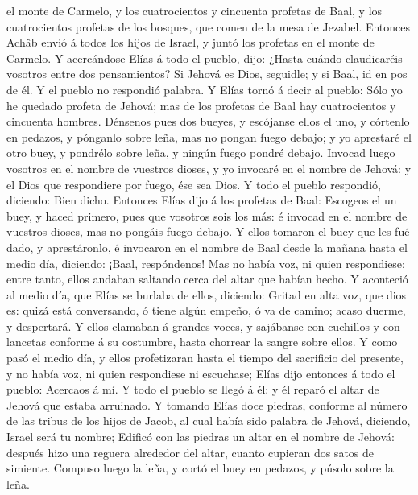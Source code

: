 el monte de Carmelo, y los cuatrocientos y cincuenta profetas de Baal, y
los cuatrocientos profetas de los bosques, que comen de la mesa de
Jezabel.  Entonces Achâb envió á todos los hijos de
Israel, y juntó los profetas en el monte de Carmelo.  Y
acercándose Elías á todo el pueblo, dijo: ¿Hasta cuándo claudicaréis
vosotros entre dos pensamientos? Si Jehová es Dios, seguidle; y si Baal,
id en pos de él. Y el pueblo no respondió palabra.  Y
Elías tornó á decir al pueblo: Sólo yo he quedado profeta de Jehová; mas
de los profetas de Baal hay cuatrocientos y cincuenta hombres.
 Dénsenos pues dos bueyes, y escójanse ellos el uno, y
córtenlo en pedazos, y pónganlo sobre leña, mas no pongan fuego debajo;
y yo aprestaré el otro buey, y pondrélo sobre leña, y ningún fuego
pondré debajo.  Invocad luego vosotros en el nombre de
vuestros dioses, y yo invocaré en el nombre de Jehová: y el Dios que
respondiere por fuego, ése sea Dios. Y todo el pueblo respondió,
diciendo: Bien dicho.  Entonces Elías dijo á los profetas
de Baal: Escogeos el un buey, y haced primero, pues que vosotros sois
los más: é invocad en el nombre de vuestros dioses, mas no pongáis fuego
debajo.  Y ellos tomaron el buey que les fué dado, y
aprestáronlo, é invocaron en el nombre de Baal desde la mañana hasta el
medio día, diciendo: ¡Baal, respóndenos! Mas no había voz, ni quien
respondiese; entre tanto, ellos andaban saltando cerca del altar que
habían hecho.  Y aconteció al medio día, que Elías se
burlaba de ellos, diciendo: Gritad en alta voz, que dios es: quizá está
conversando, ó tiene algún empeño, ó va de camino; acaso duerme, y
despertará.  Y ellos clamaban á grandes voces, y
sajábanse con cuchillos y con lancetas conforme á su costumbre, hasta
chorrear la sangre sobre ellos.  Y como pasó el medio
día, y ellos profetizaran hasta el tiempo del sacrificio del presente, y
no había voz, ni quien respondiese ni escuchase;  Elías
dijo entonces á todo el pueblo: Acercaos á mí. Y todo el pueblo se llegó
á él: y él reparó el altar de Jehová que estaba arruinado.
 Y tomando Elías doce piedras, conforme al número de las
tribus de los hijos de Jacob, al cual había sido palabra de Jehová,
diciendo, Israel será tu nombre;  Edificó con las piedras
un altar en el nombre de Jehová: después hizo una reguera alrededor del
altar, cuanto cupieran dos satos de simiente.  Compuso
luego la leña, y cortó el buey en pedazos, y púsolo sobre la leña.
